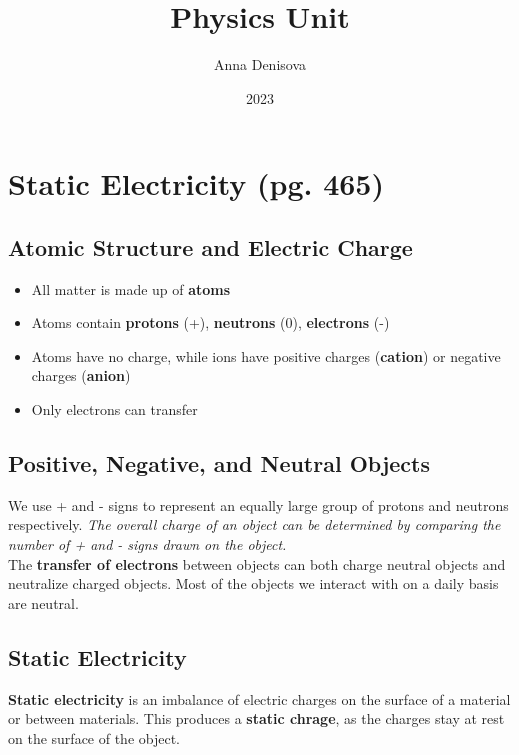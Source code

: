 \documentclass{article}
\title{Physics Unit}
\author{Anna Denisova}
\date{2023}
\begin{document}
\maketitle
\tableofcontents

\newpage


\section{Static Electricity (pg. 465)}

    \subsection*{Atomic Structure and Electric Charge}

    \begin{itemize}
        \item All matter is made up of \textbf{atoms} 
        \item Atoms contain \textbf{protons} (+), \textbf{neutrons} (0), \textbf{electrons} (-)
        \item Atoms have no charge, while ions have positive charges (\textbf{cation}) or negative charges (\textbf{anion})
        \item Only electrons can transfer
    \end{itemize}

    \subsection*{Positive, Negative, and Neutral Objects}

    We use + and - signs to represent an equally large group of protons and neutrons respectively. \textit{The overall charge of an object can be determined by comparing the number of + and - signs drawn on the object.}\\
    
    \noindent
    The \textbf{transfer of electrons} between objects can both charge neutral objects and neutralize charged objects. Most of the objects we interact with on a daily basis are neutral.

    \subsection*{Static Electricity}
    \textbf{Static electricity} is an imbalance of electric charges on the surface of a material or between materials. This produces a \textbf{static chrage}, as the charges stay at rest on the surface of the object.\\
\end{document}

